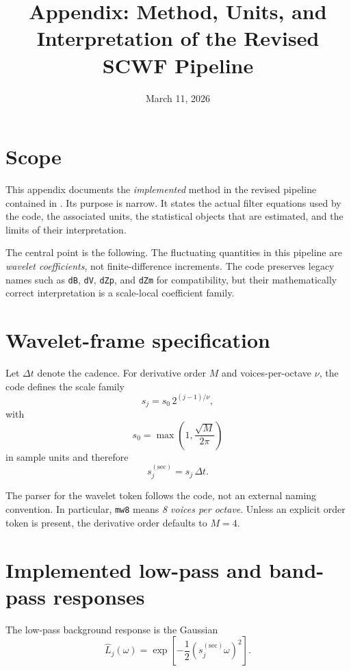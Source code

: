 \documentclass[11pt]{article}
\title{Appendix: Method, Units, and Interpretation of the Revised SCWF Pipeline}
\author{}
\date{March 11, 2026}
\begin{document}
\maketitle

\section{Scope}

This appendix documents the \emph{implemented} method in the revised pipeline
contained in . Its purpose is narrow. It states the actual
filter equations used by the code, the associated units, the statistical objects
that are estimated, and the limits of their interpretation.

The central point is the following. The fluctuating quantities in this pipeline are
\emph{wavelet coefficients}, not finite-difference increments. The code preserves
legacy names such as \texttt{dB}, \texttt{dV}, \texttt{dZp}, and \texttt{dZm} for
compatibility, but their mathematically correct interpretation is a scale-local
coefficient family.

\section{Wavelet-frame specification}

Let $\Delta t$ denote the cadence. For derivative order $M$ and voices-per-octave
$\nu$, the code defines the scale family
\begin{equation}
 s_j = s_0 \, 2^{(j-1)/\nu},
\end{equation}
with
\begin{equation}
 s_0 = \max\!\left(1, \frac{\sqrt{M}}{2\pi}\right)
\end{equation}
in sample units and therefore
\begin{equation}
 s_j^{(\mathrm{sec})} = s_j \, \Delta t.
\end{equation}

The parser for the wavelet token follows the code, not an external naming
convention. In particular, \texttt{mw8} means \emph{8 voices per octave}. Unless an
explicit order token is present, the derivative order defaults to $M=4$.

\section{Implemented low-pass and band-pass responses}

The low-pass background response is the Gaussian
\begin{equation}
 \widehat{L}_j(\omega) = \exp\!\left[-\frac{1}{2}(s_j^{(\mathrm{sec})}\omega)^2\right].
\end{equation}
\end{document}
